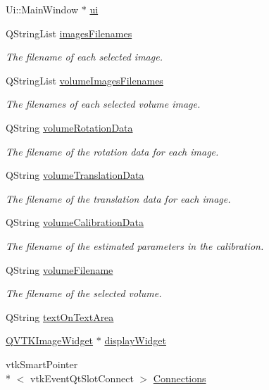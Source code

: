\begin{DoxyCompactItemize}
\item 
Ui\-::\-Main\-Window $\ast$ \hyperlink{class_main_window_a35466a70ed47252a0191168126a352a5}{ui}
\item 
Q\-String\-List \hyperlink{class_main_window_a8b33f17919e8e99127a612476aefdaed}{images\-Filenames}
\begin{DoxyCompactList}\small\item\em The filename of each selected image. \end{DoxyCompactList}\item 
Q\-String\-List \hyperlink{class_main_window_a1a88d2961b59b38eb58bffeb1a6ffe39}{volume\-Images\-Filenames}
\begin{DoxyCompactList}\small\item\em The filenames of each selected volume image. \end{DoxyCompactList}\item 
Q\-String \hyperlink{class_main_window_ad2139711b6f91f541304b5dc5cf311ac}{volume\-Rotation\-Data}
\begin{DoxyCompactList}\small\item\em The filename of the rotation data for each image. \end{DoxyCompactList}\item 
Q\-String \hyperlink{class_main_window_aec94bc06393ad4a2fc014d71fbeddbd3}{volume\-Translation\-Data}
\begin{DoxyCompactList}\small\item\em The filename of the translation data for each image. \end{DoxyCompactList}\item 
Q\-String \hyperlink{class_main_window_ae44a1faf67f60347fd55e2ceebe874c3}{volume\-Calibration\-Data}
\begin{DoxyCompactList}\small\item\em The filename of the estimated parameters in the calibration. \end{DoxyCompactList}\item 
Q\-String \hyperlink{class_main_window_ae2defb97ae56b28261ea646b533c5b10}{volume\-Filename}
\begin{DoxyCompactList}\small\item\em The filename of the selected volume. \end{DoxyCompactList}\item 
Q\-String \hyperlink{class_main_window_aac7c4f4184a77a56eef59fff591c9521}{text\-On\-Text\-Area}
\item 
\hyperlink{class_q_v_t_k_image_widget}{Q\-V\-T\-K\-Image\-Widget} $\ast$ \hyperlink{class_main_window_a79daf435968c77e526ddf286bcc86a8f}{display\-Widget}
\item 
vtk\-Smart\-Pointer\\*
$<$ vtk\-Event\-Qt\-Slot\-Connect $>$ \hyperlink{class_main_window_a2581229148c6c597849b827689e58a12}{Connections}
\end{DoxyCompactItemize}


